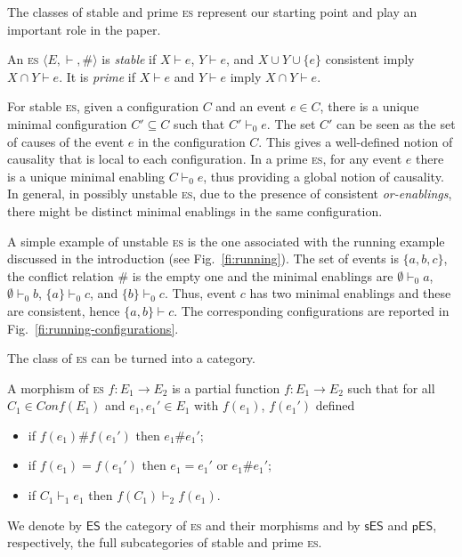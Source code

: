 \documentclass[conference]{IEEEtran}
\newcommand{\esabbr}{\textsc{es}}
\newcommand{\es}{\ensuremath{\mathsf{ES}}}
\newcommand{\ses}{\ensuremath{\mathsf{sES}}}
\newcommand{\pes}{\ensuremath{\mathsf{pES}}}
\newcommand{\conf}[1]{\ensuremath{\mathit{Conf}({#1})}}
\begin{document}
The classes of stable and prime {\esabbr} represent our starting point and 
play an important role in the paper.

\begin{definition}
  \label{de:stable-prime-es}
  An {\esabbr} $\langle E, \vdash, \# \rangle$ is \emph{stable}
  if $X\vdash e$, $Y \vdash e$, and $X \cup Y \cup \{e\}$ consistent
  imply $X \cap Y \vdash e$.  It is \emph{prime} if $X\vdash e$ and
  $Y \vdash e$ imply $X \cap Y \vdash e$.
\end{definition}

For stable {\esabbr}, given a configuration $C$ and an event $e \in C$,
there is a unique minimal configuration $C' \subseteq C$ such that
$C' \vdash_0 e$.  The set $C'$ can be seen as the set of causes of
the event $e$ in the configuration $C$. This gives a well-defined notion of
causality that is local to each configuration. In a prime {\esabbr}, for any event $e$
there is a unique minimal enabling $C \vdash_0 e$, thus providing a
global notion of causality.
%
In general, in possibly unstable {\esabbr}, due to the presence of consistent
\emph{or-enablings}, there might be distinct minimal enablings in the
same configuration.

\begin{example}
  \label{ex:event-structure}
  A simple example of unstable {\esabbr} is the one associated with
  the running example discussed in the introduction (see
  Fig.~\ref{fi:running}). The set of events is $\{ a, b, c \}$, the
  conflict relation $\#$ is the empty one and the minimal enablings
  are $\emptyset \vdash_0 a$, $\emptyset \vdash_0 b$,
  $\{ a\} \vdash_0 c$, and $\{ b\} \vdash_0 c$. Thus, event $c$ has
  two minimal enablings and these are consistent, hence
  $ \{ a, b \} \vdash c$.  The corresponding configurations are
  reported in Fig.~\ref{fi:running-configurations}.
\end{example}


The class of {\esabbr} can be turned into a category.

\begin{definition}
  \label{de:es-morphism}
  A morphism of {\esabbr} $f : {E}_1 \to {E}_2$
  is a partial function $f : E_1 \to E_2$ such that for all
  $C_1 \in \conf{E_1}$ and $e_1, e_1' \in E_1$ with $f(e_1)$, $f(e_1')$ defined
  \begin{itemize}
  \item if $f(e_1) \# f(e_1')$ then $e_1 \# e_1'$;
  \item if $f(e_1) = f(e_1')$ then  $e_1 = e_1'$ or $e_1 \# e_1'$;
  \item if $C_1 \vdash_1 e_1$ then $f(C_1) \vdash_2 f(e_1)$.
  \end{itemize}
  We denote by $\es$ the category of {\esabbr} and their
  morphisms and by $\ses$ and $\pes$, respectively, the full subcategories of stable and prime {\esabbr}.
\end{definition}
\end{document}
